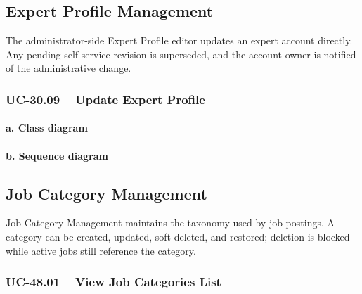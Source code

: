 

\subsection{Expert Profile Management}

The administrator-side Expert Profile editor updates an expert account
directly. Any pending self-service revision is superseded, and the account
owner is notified of the administrative change.

\subsubsection{UC-30.09 -- Update Expert Profile}

\paragraph*{a. Class diagram}

\paragraph*{b. Sequence diagram}

\subsection{Job Category Management}

Job Category Management maintains the taxonomy used by job postings. A
category can be created, updated, soft-deleted, and restored; deletion is
blocked while active jobs still reference the category.

\subsubsection{UC-48.01 -- View Job Categories List}

